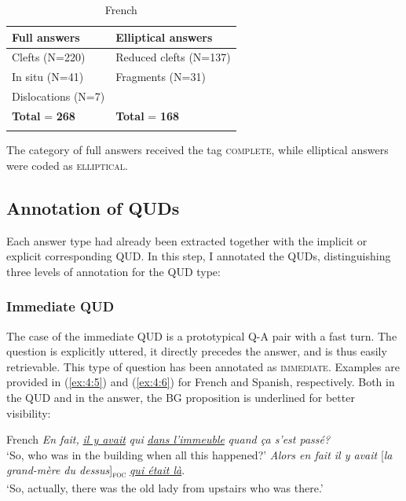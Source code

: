 \begin{table}
\caption{French}
\begin{tabularx}{0.8\textwidth}{Q >{\arraybackslash}X}
\lsptoprule
\textbf{Full answers} & \textbf{Elliptical answers} \\
\midrule
Clefts (N=220) & Reduced clefts (N=137) \\
In situ (N=41) & Fragments (N=31) \\
Dislocations (N=7) & \\
\midrule
\textbf{Total} = \textbf{268} & \textbf{Total} = \textbf{168} \\
\lspbottomrule
\end{tabularx}
\end{table}



 The category of full answers received the tag \textsc{complete}, while elliptical answers were coded as \textsc{elliptical}.

\subsection{Annotation of QUDs} \label{sub:5.2.2}

Each answer type had already been extracted together with the implicit or explicit corresponding QUD. In this step, I annotated the QUDs, distinguishing three levels of annotation for the QUD type:

\subsubsection{Immediate QUD}
The case of the immediate QUD is a prototypical Q-A pair with a fast turn. The question is explicitly uttered, it directly precedes the answer, and is thus easily retrievable. This type of question has been annotated as \textsc{immediate}. Examples are provided in (\ref{ex:4:5}) and (\ref{ex:4:6}) for French and Spanish, respectively. Both in the QUD and in the answer, the BG proposition is underlined for better visibility:

 \ea\label{ex:4:5} French
\ea \textit{En fait,} \uline{\textit{il y avait}} \textit{qui} \uline{\textit{dans l'immeuble}} \textit{quand ça s'est passé?}\\
 ‘So, who was in the building when all this happened?'
\ex \textit{Alors en fait il y avait} {[\textit{la grand-mère du dessus}]\textsubscript{\textsc{foc}}} \normalsize \uline{\textit{qui était là}}.\\
‘So, actually, there was the old lady from upstairs who was there.' 

